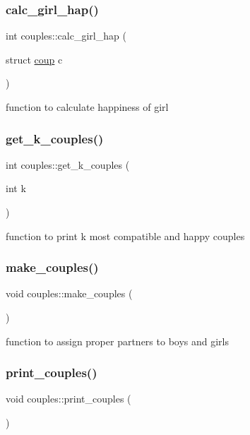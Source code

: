 \subsubsection{\texorpdfstring{calc\+\_\+girl\+\_\+hap()}{calc\_girl\_hap()}}
{\footnotesize\ttfamily int couples\+::calc\+\_\+girl\+\_\+hap (\begin{DoxyParamCaption}\item[{struct \hyperlink{structcouples_1_1coup}{coup}}]{c }\end{DoxyParamCaption})}

function to calculate happiness of girl \mbox{\label{classcouples_af4c76bdad4ebed50ef84498ab71121dd}} 
\subsubsection{\texorpdfstring{get\+\_\+k\+\_\+couples()}{get\_k\_couples()}}
{\footnotesize\ttfamily int couples\+::get\+\_\+k\+\_\+couples (\begin{DoxyParamCaption}\item[{int}]{k }\end{DoxyParamCaption})}

function to print k most compatible and happy couples \mbox{\label{classcouples_a5ed789c462f864bfd2ca734c49f5a9f2}} 
\subsubsection{\texorpdfstring{make\+\_\+couples()}{make\_couples()}}
{\footnotesize\ttfamily void couples\+::make\+\_\+couples (\begin{DoxyParamCaption}{ }\end{DoxyParamCaption})}

function to assign proper partners to boys and girls \mbox{\label{classcouples_a7740f922a426f0f9b64bf284be3eb251}} 
\subsubsection{\texorpdfstring{print\+\_\+couples()}{print\_couples()}}
{\footnotesize\ttfamily void couples\+::print\+\_\+couples (\begin{DoxyParamCaption}{ }\end{DoxyParamCaption})}

